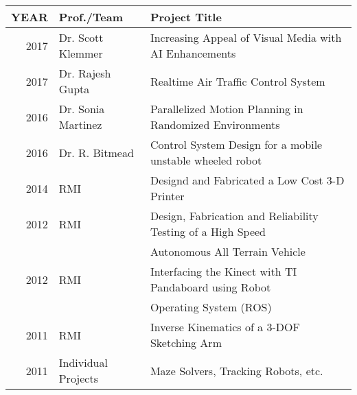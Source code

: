 \documentclass[]{deedy-resume-openfont}
\begin{document}
\begin{minipage}[t]{0.66\textwidth}
\begin{tabular}{rll}
YEAR	     & Prof./Team  & Project Title \\
\hline
2017	     & Dr. Scott Klemmer & Increasing Appeal of Visual Media with AI Enhancements\\
2017	     & Dr. Rajesh Gupta & Realtime Air Traffic Control System \\ 
2016         & Dr. Sonia Martinez & Parallelized Motion Planning in Randomized Environments\\
2016         &Dr. R. Bitmead & Control System Design for a mobile unstable wheeled robot\\
2014	     & RMI  & Designd and Fabricated a Low Cost 3-D Printer\\
2012	     & RMI & Design, Fabrication and Reliability Testing of a High Speed \\& & Autonomous All Terrain Vehicle\\
2012	     & RMI & Interfacing the Kinect  with TI Pandaboard using Robot \\& & Operating System (ROS)\\
2011         & RMI & Inverse Kinematics of  a 3-DOF Sketching Arm \\
2011        &  Individual Projects & Maze Solvers, Tracking Robots, etc.\\
\end{tabular}
\sectionsep








\end{minipage} 
\end{document}
